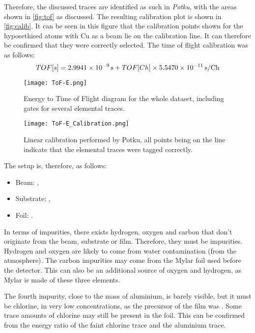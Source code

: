 Therefore, the discussed traces are identified as such in \textit{Potku}, with the areas shown in \autoref{fig:tof} as discussed. The resulting calibration plot is shown in \autoref{fig:calib}. It can be seen in this figure that the calibration points shown for the hyposethised atoms with Cu as a beam lie on the calibration line. It can therefore be confirmed that they were correctly selected. The time of flight calibration was as follows:
\begin{equation}
    \label{eq:tofcal}
    TOF[s] = 2.9941\times 10^{-9}\,\text{s} + TOF[Ch]\times5.5470\times 10^{-11}\,\text{s/Ch}
\end{equation}
\newpage

\begin{figure}[!h]
    \centering
    \texttt{[image: ToF-E.png]}
    \caption{Energy to Time of Flight diagram for the whole dataset, including gates for several elemental traces.}
    \label{fig:tof}
\end{figure}

\begin{figure}[!h]
    \centering
    \texttt{[image: ToF-E\_Calibration.png]}
    \caption{Linear calibration performed by Potku, all points being on the line indicate that the elemental traces were tagged correctly.}
    \label{fig:calib}
\end{figure}
\newpage


The setup is, therefore, as follows: \begin{itemize}
    \item Beam: ,
    \item Substrate: ,
    \item Foil: . 
\end{itemize}
In terms of impurities, there exists hydrogen, oxygen and carbon that don't originate from the beam, substrate or film. Therefore, they must be impurities. Hydrogen and oxygen are likely to come from water contamination (from the atmosphere). The carbon impurities may come from the Mylar foil used before the detector. This can also be an additional source of oxygen and hydrogen, as Mylar is made of these three elements.

The fourth impurity, close to the mass of aluminium, is barely visible, but it must be chlorine, in very low concentrations, as the precursor of the film was . Some trace amounts of chlorine may still be present in the foil. This can be confirmed from the energy ratio of the faint chlorine trace and the aluminium trace.

